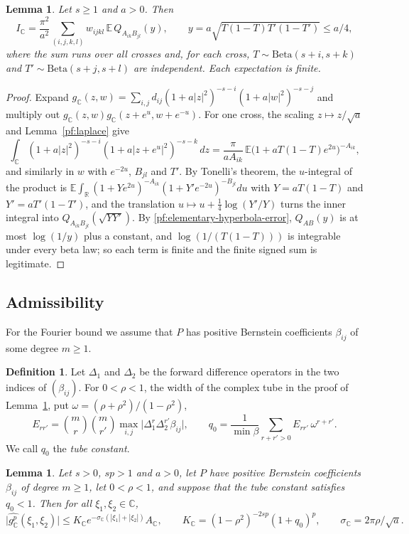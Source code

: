 \documentclass[11pt]{amsart}
\numberwithin{equation}{section}
\newtheorem{lemma}[equation]{Lemma}
\theoremstyle{definition}
\newtheorem{definition}[equation]{Definition}
\theoremstyle{remark}
\newcommand{\R}{\mathbb R}
\newcommand{\C}{\mathbb C}
\begin{document}
\begin{lemma}\label{pf:pair-reduction}
Let $s\ge1$ and $a>0$. Then
\[
 I_\C=\frac{\pi^2}{a^2}\sum_{(i,j,k,l)}w_{ijkl}\,
 \mathbb E\,Q_{A_{ik}B_{jl}}(y),\qquad
 y=a\sqrt{T(1-T)T'(1-T')}\le a/4,
\]
where the sum runs over all crosses and, for each cross,
$T\sim\mathrm{Beta}(s+i,s+k)$ and $T'\sim\mathrm{Beta}(s+j,s+l)$ are
independent. Each expectation is finite.
\end{lemma}

\begin{proof}
Expand $g_\C(z,w)=\sum_{i,j}d_{ij}(1+a|z|^2)^{-s-i}(1+a|w|^2)^{-s-j}$ and
multiply out $g_\C(z,w)g_\C(z+e^u,w+e^{-u})$. For one cross, the scaling
$z\mapsto z/\sqrt a$ and Lemma~\ref{pf:laplace} give
\[
 \int_\C(1+a|z|^2)^{-s-i}(1+a|z+e^u|^2)^{-s-k}\,dz
 =\frac\pi{aA_{ik}}\,\mathbb E\bigl(1+aT(1-T)e^{2u}\bigr)^{-A_{ik}},
\]
and similarly in $w$ with $e^{-2u}$, $B_{jl}$ and $T'$. By Tonelli's
theorem, the $u$-integral of the product is
$\mathbb E\int_\R(1+Ye^{2u})^{-A_{ik}}(1+Y'e^{-2u})^{-B_{jl}}du$ with
$Y=aT(1-T)$ and $Y'=aT'(1-T')$, and the translation
$u\mapsto u+\frac14\log(Y'/Y)$ turns the inner integral into
$Q_{A_{ik}B_{jl}}(\sqrt{YY'})$. By
\eqref{pf:elementary-hyperbola-error}, $Q_{AB}(y)$ is at most
$\log(1/y)$ plus a constant, and $\log(1/(T(1-T)))$ is integrable under
every beta law; so each term is finite and the finite signed sum is
legitimate.
\end{proof}

\subsection{Admissibility}

For the Fourier bound we assume that $P$ has positive Bernstein
coefficients $\beta_{ij}$ of some degree $m\ge1$.

\begin{definition}\label{pf:tube-constant}
Let $\Delta_1$ and $\Delta_2$ be the forward difference operators in
the two indices of $(\beta_{ij})$. For $0<\rho<1$, the width of the
complex tube in the proof of Lemma~\ref{pf:tube}, put
$\omega=(\rho+\rho^2)/(1-\rho^2)$,
\[
 E_{rr'}=\binom mr\binom m{r'}\max_{i,j}\bigl|\Delta_1^r\Delta_2^{r'}
 \beta_{ij}\bigr|,\qquad
 q_0=\frac1{\min\beta}\sum_{r+r'>0}E_{rr'}\,\omega^{r+r'} .
\]
We call $q_0$ the \emph{tube constant}.
\end{definition}

\begin{lemma}\label{pf:tube}
Let $s>0$, $sp>1$ and $a>0$, let $P$ have positive Bernstein coefficients
$\beta_{ij}$ of degree $m\ge1$, let $0<\rho<1$, and suppose that the tube
constant satisfies $q_0<1$. Then for all $\xi_1,\xi_2\in\C$,
\[
 \bigl|\widehat{g_\C^p}(\xi_1,\xi_2)\bigr|
 \le K_\C e^{-\sigma_\C(|\xi_1|+|\xi_2|)}A_\C,\qquad
 K_\C=(1-\rho^2)^{-2sp}(1+q_0)^p,\qquad
 \sigma_\C=2\pi\rho/\sqrt a .
\]
\end{lemma}
\end{document}
